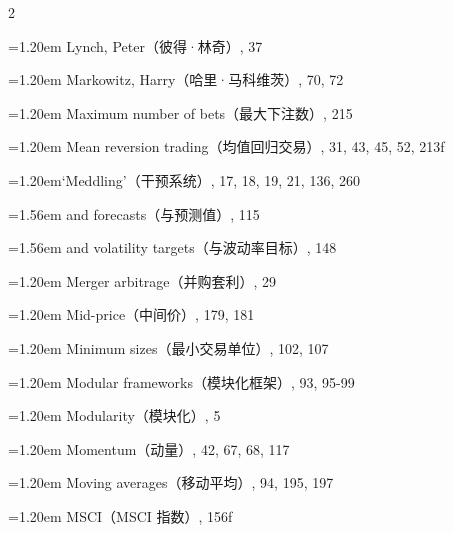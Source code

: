{\begin{multicols}{2}
\par \noindent\hangindent=1.20em\hspace*{0.00em} Lynch, Peter（彼得·林奇）, 37
\par \noindent\hangindent=1.20em\hspace*{0.00em} Markowitz, Harry（哈里·马科维茨）, 70, 72
\par \noindent\hangindent=1.20em\hspace*{0.00em} Maximum number of bets（最大下注数）, 215
\par \noindent\hangindent=1.20em\hspace*{0.00em} Mean reversion trading（均值回归交易）, 31, 43, 45, 52, 213f
\par \noindent\hangindent=1.20em\hspace*{0.00em}‘Meddling’（干预系统）, 17, 18, 19, 21, 136, 260
\par \noindent\hangindent=1.56em\hspace*{0.36em} and forecasts（与预测值）, 115
\par \noindent\hangindent=1.56em\hspace*{0.36em} and volatility targets（与波动率目标）, 148
\par \noindent\hangindent=1.20em\hspace*{0.00em} Merger arbitrage（并购套利）, 29
\par \noindent\hangindent=1.20em\hspace*{0.00em} Mid-price（中间价）, 179, 181
\par \noindent\hangindent=1.20em\hspace*{0.00em} Minimum sizes（最小交易单位）, 102, 107
\par \noindent\hangindent=1.20em\hspace*{0.00em} Modular frameworks（模块化框架）, 93, 95-99
\par \noindent\hangindent=1.20em\hspace*{0.00em} Modularity（模块化）, 5
\par \noindent\hangindent=1.20em\hspace*{0.00em} Momentum（动量）, 42, 67, 68, 117
\par \noindent\hangindent=1.20em\hspace*{0.00em} Moving averages（移动平均）, 94, 195, 197
\par \noindent\hangindent=1.20em\hspace*{0.00em} MSCI（MSCI 指数）, 156f

\end{multicols}}

